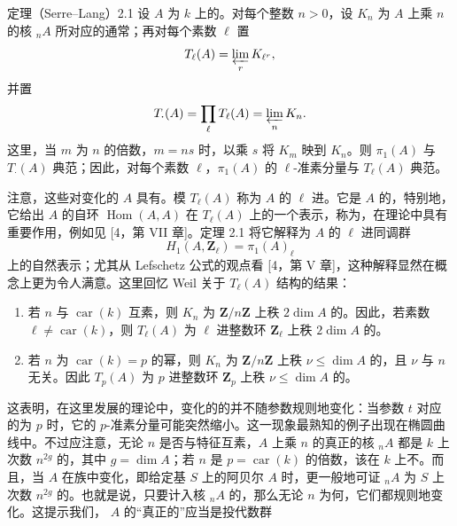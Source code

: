 \begin{SGAresult}{定理（Serre–Lang）}{2.1}
设 $A$ 为 $k$ 上的。对每个整数 $n>0$，设 $K_n$ 为 $A$ 上乘 $n$ 的核 ${}_nA$ 所对应的通常；再对每个素数 $\ell$ 置
\[
T_\ell(A)=\varprojlim_r K_{\ell^r},
\]
并置
\[
T_{\boldsymbol\cdot}(A)=\prod_\ell T_\ell(A)=\varprojlim_n K_n.
\]
这里，当 $m$ 为 $n$ 的倍数，$m=ns$ 时，以乘 $s$ 将 $K_m$ 映到 $K_n$。则 $\pi_1(A)$ 与 $T_{\boldsymbol\cdot}(A)$ 典范；因此，对每个素数 $\ell$，$\pi_1(A)$ 的 $\ell$-准素分量与 $T_\ell(A)$ 典范。
\end{SGAresult}
注意，这些对变化的 $A$ 具有。模 $T_\ell(A)$ 称为 $A$ 的 $\ell$ 进。它是 $A$ 的，特别地，它给出 $A$ 的自环 $\operatorname{Hom}(A,A)$ 在 $T_\ell(A)$ 上的一个表示，称为，在理论中具有重要作用，例如见 [4，第 VII 章]。定理 2.1 将它解释为 $A$ 的 $\ell$ 进同调群
\[
H_1(A,\mathbf Z_\ell)=\pi_1(A)_\ell
\]
上的自然表示；尤其从 Lefschetz 公式的观点看 [4，第 V 章]，这种解释显然在概念上更为令人满意。这里回忆 Weil 关于 $T_\ell(A)$ 结构的结果：
\begin{enumerate}[label=\alph*)]
\item 若 $n$ 与 $\operatorname{car}(k)$ 互素，则 $K_n$ 为 $\mathbf Z/n\mathbf Z$ 上秩 $2\dim A$ 的。因此，若素数 $\ell\ne\operatorname{car}(k)$，则 $T_\ell(A)$ 为 $\ell$ 进整数环 $\mathbf Z_\ell$ 上秩 $2\dim A$ 的。
\item 若 $n$ 为 $\operatorname{car}(k)=p$ 的幂，则 $K_n$ 为 $\mathbf Z/n\mathbf Z$ 上秩 $\nu\leq\dim A$ 的，且 $\nu$ 与 $n$ 无关。因此 $T_p(A)$ 为 $p$ 进整数环 $\mathbf Z_p$ 上秩 $\nu\leq\dim A$ 的。
\end{enumerate}
这表明，在这里发展的理论中，变化的的并不随参数规则地变化：当参数 $t$ 对应的为 $p$ 时，它的 $p$-准素分量可能突然缩小。这一现象最熟知的例子出现在椭圆曲线中。不过应注意，无论 $n$ 是否与特征互素，$A$ 上乘 $n$ 的真正的核 ${}_nA$ 都是 $k$ 上次数 $n^{2g}$ 的，其中 $g=\dim A$；若 $n$ 是 $p=\operatorname{car}(k)$ 的倍数，该在 $k$ 上不。而且，当 $A$ 在族中变化，即给定基 $S$ 上的阿贝尔 $A$ 时，更一般地可证 ${}_nA$ 为 $S$ 上次数 $n^{2g}$ 的。也就是说，只要计入核 ${}_nA$ 的，那么无论 $n$ 为何，它们都规则地变化。这提示我们， $A$ 的“真正的”应当是投代数群
